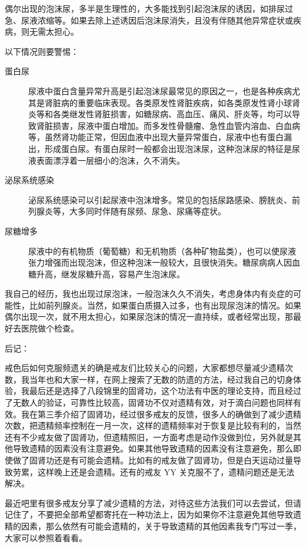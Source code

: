 \documentclass{ctexart}
\begin{document}
偶尔出现的泡沫尿，多半是生理性的，大多能找到引起泡沫尿的诱因，如排尿过急、尿液浓缩等。如果去除上述诱因后泡沫尿消失，且没有伴随其他异常症状或疾病，则无需太担心。

以下情况则要警惕：

\begin{description}
    \item[蛋白尿] 尿液中蛋白含量异常升高是引起泡沫尿最常见的原因之一，也是各种疾病尤其是肾脏病的重要临床表现。各类原发性肾脏疾病，如各类原发性肾小球肾炎等和各类继发性肾脏损害，如糖尿病、高血压、痛风、肝炎等，均可以导致肾脏损害，尿液中蛋白增加。而多发性骨髓瘤、急性血管内溶血、白血病等，虽然肾功能正常，但因血液中出现大量异常蛋白，尿液中也有蛋白漏出，形成蛋白尿。有蛋白尿时一般都会出现泡沫尿，这种泡沫尿的特征是尿液表面漂浮着一层细小的泡沫，久不消失。
    \item[泌尿系统感染] 泌尿系统感染可以引起尿液中泡沫增多。常见的包括尿路感染、膀胱炎、前列腺炎等，大多同时伴随有尿频、尿急、尿痛等症状。
    \item[尿糖增多] 尿液中的有机物质（葡萄糖）和无机物质（各种矿物盐类），也可以使尿液张力增强而出现泡沫，但这种泡沫一般较大，且很快消失。糖尿病病人因血糖升高，继发尿糖升高，容易产生泡沫尿。
\end{description}

我自己的经历，我也出现过尿泡沫，一般泡沫久久不消失，考虑身体内有炎症的可能性，比如前列腺炎。当然，如果蛋白质摄入过多，也有出现尿泡沫的情况。如果偶尔出现一次，就不用太担心，如果尿泡沫的情况一直持续，或者经常出现，那最好去医院做个检查。

后记：

戒色后如何克服频遗关的确是戒友们比较关心的问题，大家都想尽量减少遗精次数，我当年也和大家一样，在网上搜索了无数的防遗的方法，经过我自己的切身体验，我最后还是选择了八段锦里的固肾功，这个功法有中医的理论支持，而且经过了无数人的验证，可靠性比较高，固肾功不仅对遗精有效，对于滴白问题也同样有效。我在第三季介绍了固肾功，经过很多戒友的反馈，很多人的确做到了减少遗精次数，把遗精频率控制在一月一次，这样的遗精频率对于恢复是比较有利的，当然还有不少戒友做了固肾功，但遗精照旧，一方面考虑是动作没做到位，另外就是其他导致遗精的因素没有注意避免。如果其他导致遗精的因素没有注意避免，那么即使做了固肾功还是有可能会遗精。比如有的戒友做了固肾功，但是白天运动过量导致劳累，这样晚上还是会遗精。还有的戒友 YY 关克服不了，遗精问题还是无法解决。

最近吧里有很多戒友分享了减少遗精的方法，对待这些方法我们可以去尝试，但请记住了，不要把全部希望都寄托在一种功法上，因为如果你不注意避免其他导致遗精的因素，那么依然有可能会遗精的，关于导致遗精的其他因素我专门写过一季，大家可以参照着看看。
\end{document}
